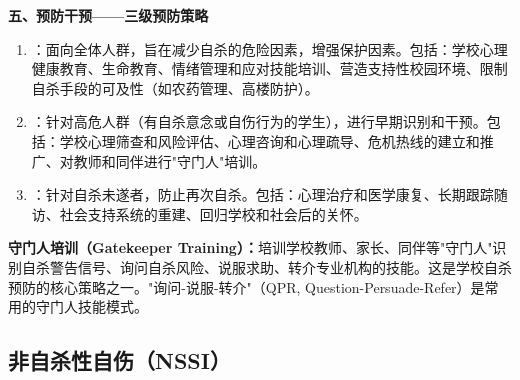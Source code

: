 \begin{keybox}
\textbf{五、预防干预——三级预防策略}
\begin{enumerate}[leftmargin=*]
    \item {}：面向全体人群，旨在减少自杀的危险因素，增强保护因素。包括：学校心理健康教育、生命教育、情绪管理和应对技能培训、营造支持性校园环境、限制自杀手段的可及性（如农药管理、高楼防护）。

    \item {}：针对高危人群（有自杀意念或自伤行为的学生），进行早期识别和干预。包括：学校心理筛查和风险评估、心理咨询和心理疏导、危机热线的建立和推广、对教师和同伴进行"守门人"培训。

    \item {}：针对自杀未遂者，防止再次自杀。包括：心理治疗和医学康复、长期跟踪随访、社会支持系统的重建、回归学校和社会后的关怀。
\end{enumerate}
\end{keybox}

\begin{tipbox}
\textbf{守门人培训（Gatekeeper Training）：}培训学校教师、家长、同伴等"守门人"识别自杀警告信号、询问自杀风险、说服求助、转介专业机构的技能。这是学校自杀预防的核心策略之一。"询问-说服-转介"（QPR, Question-Persuade-Refer）是常用的守门人技能模式。
\end{tipbox}

\subsection{非自杀性自伤（NSSI）}


